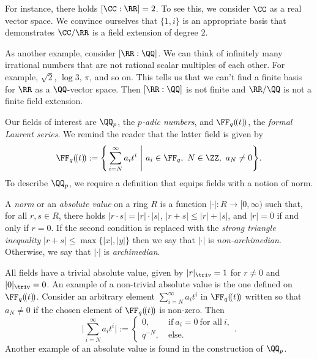 \documentclass[11pt]{amsart}
\theoremstyle{remark}
\begin{document}
For instance, there holds $[\CC:\RR]=2$.
To see this, we consider $\CC$ as a real vector space.
We convince ourselves that $\{1,i\}$ is an appropriate basis that demonstrates $\CC/\RR$ is a field extension of degree $2$.

As another example, consider $[\RR:\QQ]$.
We can think of infinitely many irrational numbers that are not rational scalar multiples of each other.
For example, $\sqrt{2}$, $\log 3$, $\pi$, and so on.
This tells us that we can't find a finite basis for $\RR$ as a $\QQ$-vector space.
Then $[\RR:\QQ]$ is not finite and $\RR/\QQ$ is not a finite field extension.

Our fields of interest are $\QQ_p$, the \emph{$p$-adic numbers}, and $\FF_q(\!(t)\!)$, the \emph{formal Laurent series}.
We remind the reader that the latter field is given by
\[
	\FF_q(\!(t)\!) := \Bigg\{\sum_{i=N}^\infty a_it^i\ \Bigg|\ a_i\in\FF_q,\ N\in\ZZ,\ a_N\neq 0\Bigg\}.
\]
To describe $\QQ_p$, we require a definition that equips fields with a notion of norm.

A \emph{norm} or an \emph{absolute value} on a ring $R$ is a function $|\cdot|\colon R\to[0,\infty)$ such that, for all $r,s\in R$, there holds $|r\cdot s| = |r|\cdot|s|$, $|r+s|\leq |r|+|s|$, and $|r|=0$ if and only if $r=0$.
If the second condition is replaced with the \emph{strong triangle inequality} $|r+s|\leq \max\{|x|,|y|\}$ then we say that $|\cdot|$ is \emph{non-archimedian}.
Otherwise, we say that $|\cdot|$ is \emph{archimedian}.

All fields have a trivial absolute value, given by $|r|_\triv = 1$ for $r\neq 0$ and $|0|_\triv=0$.
An example of a non-trivial absolute value is the one defined on $\FF_q(\!(t)\!)$.
Consider an arbitrary element $\sum_{i=N}^\infty a_it^i$ in $\FF_q(\!(t)\!)$ written so that $a_N\neq 0$ if the chosen element of $\FF_q(\!(t)\!)$ is non-zero.
Then
\[
	\Bigg|\sum_{i=N}^\infty a_it^i\Bigg| := \begin{cases}
		0,\       & \text{if}\ a_i = 0\ \text{for all}\ i, \\
		q^{-N},\  & \text{else}.
	\end{cases}.
\]
Another example of an absolute value is found in the construction of $\QQ_p$.
\end{document}
